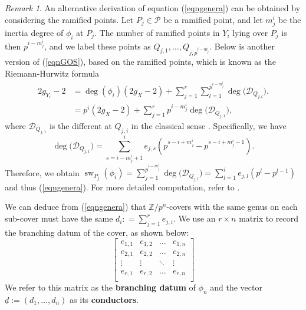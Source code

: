 \documentclass{compositio}
\theoremstyle{remark}
\theoremstyle{remark}
\newtheorem{remark}[theorem]{Remark}
\DeclareMathOperator{\sw}{sw}
\begin{document}
\begin{remark}
\label{remarkgosramified}
    An alternative derivation of equation (\ref{eqngenera}) can be obtained by considering the ramified points. Let $P_j \in \mathscr{P}$ be a ramified point, and let $m^i_j$ be the inertia degree of $\phi_i$ at $P_j$. The number of ramified points in $Y_i$ lying over $P_j$ is then $p^{i-m^i_j}$, and we label these points as $Q_{j,1}, \ldots, Q_{j,p^{i-m^i_j}}$. Below is another version of (\ref{eqnGOS}), based on the ramified points, which is known as the Riemann-Hurwitz formula \cite{MR0463157}
    \begin{equation}
    \label{eqnRH}
    \begin{split}
        2g_{Y_i}-2 & =\deg(\phi_i) (2g_X-2) + \sum_{j=1}^r \sum_{l=1}^{p^{i-m^i_j}} \deg\big(\mathscr{D}_{Q_{j,l}}\big). \\
        & =p^i (2g_X-2) + \sum_{j=1}^r p^{i-m^i_j} \deg\big(\mathscr{D}_{Q_{j,1}}\big),
    \end{split}
    \end{equation}
    where $\mathscr{D}_{Q_{j,1}}$ is the different at $Q_{j,i}$ in the classical sense \cite[III, \S 3]{MR554237}. Specifically, we have
    \begin{equation*}
        \deg\big(\mathscr{D}_{Q_{j,1}}\big)= \sum_{s=i-m^i_j+1}^i e_{j,s}(p^{s-i+m^i_j}-p^{s-i+m^i_j-1}).
    \end{equation*}
    Therefore, we obtain $\sw_{P_j}(\phi_i)=\sum_{j=1}^{p^{i-m^i_j}} \deg\big(\mathscr{D}_{Q_{j,l}}\big)=\sum_{l=1}^i e_{j,l}(p^l-p^{l-1})$ and thus (\ref{eqngenera}). For more detailed computation, refer to \cite[\S 2.A.]{MR3194816}.
\end{remark}

We can deduce from (\ref{eqngenera}) that $\mathbb{Z}/p^n$-covers with the same genus on each sub-cover must have the same $d_i: = \sum_{j=1}^r e_{j,i}$. We use an $r \times n$ matrix to record the branching datum of the cover, as shown below:
\begin{equation}
\label{eqnmatrixbranchingdatum}    
\begin{bmatrix}
e_{1,1} & e_{1,2} & \ldots & e_{1,n} \\
e_{2,1} & e_{2,2} & \ldots & e_{2,n} \\
\vdots  & \vdots  & \ddots & \vdots  \\
e_{r,1} & e_{r,2} & \ldots & e_{r,n} \\
\end{bmatrix}
\end{equation}
We refer to this matrix as the \textbf{branching datum} of $\phi_n$ and the vector $\underline{d}:= (d_1, \ldots, d_n)$ as its \textbf{conductors}. 
\end{document}
